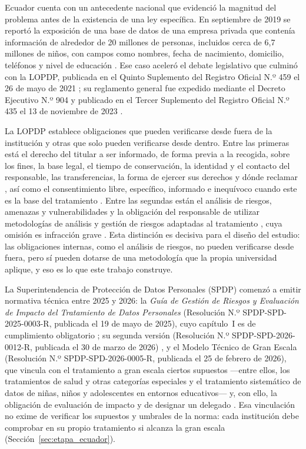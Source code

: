 Ecuador cuenta con un antecedente nacional que evidenció la magnitud del problema antes de la existencia de una ley específica. En septiembre de 2019 se reportó la exposición de una base de datos de una empresa privada que contenía información de alrededor de 20 millones de personas, incluidos cerca de 6,7 millones de niños, con campos como nombres, fecha de nacimiento, domicilio, teléfonos y nivel de educación \cite{arciniegas2019ecuador}. Ese caso aceleró el debate legislativo que culminó con la LOPDP, publicada en el Quinto Suplemento del Registro Oficial N.º 459 el 26 de mayo de 2021 \cite{lopdp2021}; su reglamento general fue expedido mediante el Decreto Ejecutivo N.º 904 y publicado en el Tercer Suplemento del Registro Oficial N.º 435 el 13 de noviembre de 2023 \cite{rlopdp2023}.

La LOPDP establece obligaciones que pueden verificarse desde fuera de la institución y otras que solo pueden verificarse desde dentro. Entre las primeras está el derecho del titular a ser informado, de forma previa a la recogida, sobre los fines, la base legal, el tiempo de conservación, la identidad y el contacto del responsable, las transferencias, la forma de ejercer sus derechos y dónde reclamar \cite[art.~12]{lopdp2021}, así como el consentimiento libre, específico, informado e inequívoco cuando este es la base del tratamiento \cite[art.~8]{lopdp2021}. Entre las segundas están el análisis de riesgos, amenazas y vulnerabilidades \cite[art.~40]{lopdp2021} y la obligación del responsable de utilizar metodologías de análisis y gestión de riesgos adaptadas al tratamiento \cite[art.~47, num.~5]{lopdp2021}, cuya omisión es infracción grave \cite[art.~68]{lopdp2021}. Esta distinción es decisiva para el diseño del estudio: las obligaciones internas, como el análisis de riesgos, no pueden verificarse desde fuera, pero sí pueden dotarse de una metodología que la propia universidad aplique, y eso es lo que este trabajo construye.

La Superintendencia de Protección de Datos Personales (SPDP) comenzó a emitir normativa técnica entre 2025 y 2026: la \textit{Guía de Gestión de Riesgos y Evaluación de Impacto del Tratamiento de Datos Personales} (Resolución N.º SPDP-SPD-2025-0003-R, publicada el 19 de mayo de 2025), cuyo capítulo~I es de cumplimiento obligatorio \cite{spdp2025guia,lexis2025guia}; su segunda versión (Resolución N.º SPDP-SPD-2026-0012-R, publicada el 30 de marzo de 2026) \cite{spdp2026guiav2}, y el Modelo Técnico de Gran Escala (Resolución N.º SPDP-SPD-2026-0005-R, publicada el 25 de febrero de 2026), que vincula con el tratamiento a gran escala ciertos supuestos ---entre ellos, los tratamientos de salud y otras categorías especiales y el tratamiento sistemático de datos de niñas, niños y adolescentes en entornos educativos--- y, con ello, la obligación de evaluación de impacto y de designar un delegado \cite[arts.~12 y 14]{spdp2026granescala}. Esa vinculación no exime de verificar los supuestos y umbrales de la norma: cada institución debe comprobar en su propio tratamiento si alcanza la gran escala (Sección~\ref{sec:etapa_ecuador}).

